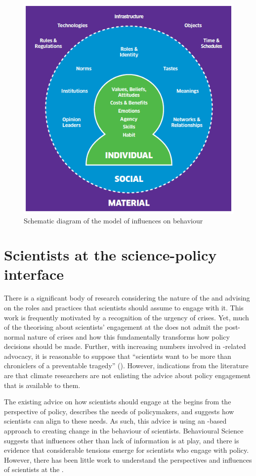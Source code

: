 \begin{figure}
    \centering
    \includegraphics[width=0.5\linewidth]{figures/ism.png}
    \caption{Schematic diagram of the \ISM{} model of influences on behaviour}
    \label{fig:ism}
\end{figure}

\section{Scientists at the science-policy interface}\label{sec:litjust}

There is a significant body of research considering the nature of the \SPI{} and advising on the roles and practices that scientists should assume to engage with it. This work is frequently motivated by a recognition of the urgency of \CAN{} crises. Yet, much of the theorising about scientists' engagement at the \SPI{} does not admit the post-normal nature of \CAN{} crises and how this fundamentally transforms how policy decisions should be made. Further, with increasing numbers involved in \CAN-related advocacy, it is reasonable to suppose that ``scientists want to be more than chroniclers of a preventable tragedy'' (\cite{WyattGT2024}). However, indications from the literature are that climate researchers are not enlisting the advice about policy engagement that is available to them.

The existing advice on how scientists should engage at the \SPI{} begins from the perspective of policy, describes the needs of policymakers, and suggests how scientists can align to these needs. As such, this advice is using an \IDM-based approach to creating change in the behaviour of scientists. Behavioural Science suggests that influences other than lack of information is at play, and there is evidence that considerable tensions emerge for scientists who engage with policy. However, there has been little work to understand the perspectives and influences of scientists at the \SPI. 
